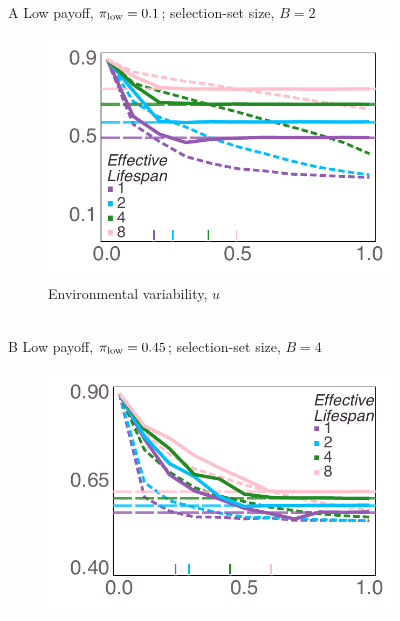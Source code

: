 \documentclass[letterpaper,11.5pt]{scrartcl}
\begin{document}
\clearpage
\begin{figure}
  \caption{Comparison of observed average payoffs in simulations with average payoffs
    obtained by populations homogeneously initialized to be all social or all asocial learners. Often the simulated payoffs follow the payoffs from the better-performing homogeneous group, with some exceptions discussed in the main text.}
  \label{fig:payoffs}
  \vspace{1em}
  \centering 
    {\textsf A \quad Low payoff, $\pi_{\mathrm{low}} = 0.1$; selection-set size, $B = 2$} \\
    \begin{subfigure}[]{0.4\textwidth}
      \centering
      \includegraphics[width=\textwidth]{Figures/mean_prev_net_payoff_over_u_lowpayoff=0.1_nbehaviors=2.pdf}
      \\[-0.8em]
      {\centering \quad Environmental variability, $u$}
    \end{subfigure} \\[1.5em]
    \centering
    {\textsf B \quad Low payoff, $\pi_{\mathrm{low}} = 0.45$; selection-set size, $B = 4$} \\
    \begin{subfigure}[]{0.4\textwidth}
      \centering
      \includegraphics[width=\textwidth]{Figures/mean_prev_net_payoff_over_u_lowpayoff=0.45_nbehaviors=4.pdf}

\end{subfigure}
\end{figure}
\end{document}
